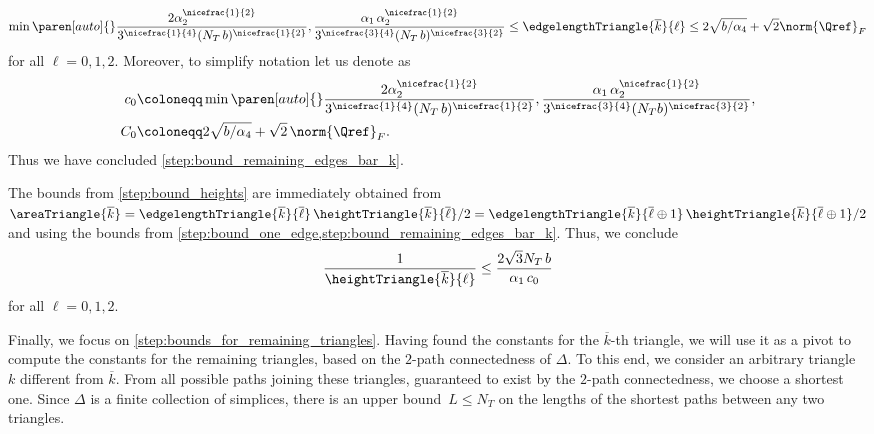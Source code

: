 \begin{equation}
	\label{eq:bounds_edgelength_triangle_bark}
		\min\paren[auto]\{\}{
			\frac{2 \alpha_2^{\nicefrac{1}{2}}}{3^{\nicefrac{1}{4}}(N_T \, b)^{\nicefrac{1}{2}}}
			,
			\frac{\alpha_1 \, \alpha_2^{\nicefrac{1}{2}}}{3^{\nicefrac{3}{4}}(N_T \, b)^{\nicefrac{3}{2}}}
		}
		\le
		\edgelengthTriangle{\overline{k}}{\ell}
		\le
		2\sqrt{b / \alpha_4} + \sqrt{2} \norm{\Qref}_F
\end{equation}
for all $\ell=0,1,2$.
Moreover, to simplify notation let us denote as
\begin{align}
	\label{eq:c0_definition}
	c_0
	&
	\coloneqq
	\min
	\paren[auto]\{\}{
		\frac{2 \alpha_2^{\nicefrac{1}{2}}}{3^{\nicefrac{1}{4}}(N_T \, b)^{\nicefrac{1}{2}}}
		,
		\frac{\alpha_1 \, \alpha_2^{\nicefrac{1}{2}}}{3^{\nicefrac{3}{4}}(N_Tb)^{\nicefrac{3}{2}}}
	}
	,
	\\
	\label{eq:C0_definition}
	C_0
	&
	\coloneqq
	2\sqrt{b / \alpha_4}
	+
	\sqrt{2} \, \norm{\Qref}_F
	.
\end{align}
Thus we have concluded \cref{step:bound_remaining_edges_bar_k}.

The bounds from \cref{step:bound_heights} are immediately obtained from $\areaTriangle{\overline{k}} = \edgelengthTriangle{\overline{k}}{\overline{\ell}} \, \heightTriangle{\overline{k}}{\overline{\ell}} / 2 = \edgelengthTriangle{\overline{k}}{\overline{\ell} \oplus 1} \, \heightTriangle{\overline{k}}{\overline{\ell} \oplus 1} / 2$ and using the bounds from \cref{step:bound_one_edge,step:bound_remaining_edges_bar_k}.
Thus, we conclude
\begin{equation*}
	\frac{1}{\heightTriangle{\overline{k}}{\ell}}
	\le
	\frac{2\sqrt{3} N_T \, b}{\alpha_1 \, c_0}
\end{equation*}
for all $\ell = 0,1,2$.

Finally, we focus on \cref{step:bounds_for_remaining_triangles}.
Having found the constants for the $\overline{k}$-th triangle, we will use it as a pivot to compute the constants for the remaining triangles, based on the $2$-path connectedness of $\Delta$.
To this end, we consider an arbitrary triangle~$k$ different from $\overline{k}$.
From all possible paths joining these triangles, guaranteed to exist by the $2$-path connectedness, we choose a shortest one.
Since $\Delta$ is a finite collection of simplices, there is an upper bound~$L \le N_T$ on the lengths of the shortest paths between any two triangles.

